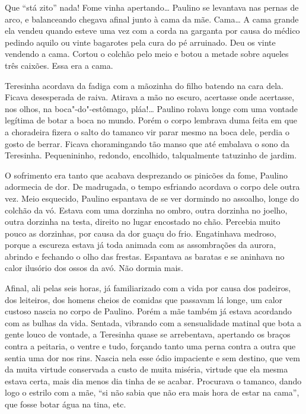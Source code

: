 \begin{linenumbers}
Que ``stá zito'' nada! Fome vinha apertando\ldots{} Paulino se levantava nas
pernas de arco, e balanceando chegava afinal junto à cama da mãe.
Cama\ldots{} A cama grande ela vendeu quando esteve uma vez com a corda na
garganta por causa do médico pedindo aquilo ou vinte bagarotes pela cura
do pé arruinado. Deu os vinte vendendo a cama. Cortou o colchão pelo
meio e botou a metade sobre aqueles três caixões. Essa era a cama.

Teresinha acordava da fadiga com a mãozinha do filho batendo na cara
dela. Ficava desesperada de raiva. Atirava a mão no escuro, acertasse
onde acertasse, nos olhos, na boca"-do"-estômago, pláa!\ldots{} Paulino rolava
longe com uma vontade legítima de botar a boca no mundo. Porém o corpo
lembrava duma feita em que a choradeira fizera o salto do tamanco vir
parar mesmo na boca dele, perdia o gosto de berrar. Ficava choramingando
tão manso que até embalava o sono da Teresinha. Pequenininho, redondo,
encolhido, talqualmente tatuzinho de jardim.

O sofrimento era tanto que acabava desprezando os pinicões da fome,
Paulino adormecia de dor. De madrugada, o tempo esfriando acordava o
corpo dele outra vez. Meio esquecido, Paulino espantava de se ver
dormindo no assoalho, longe do colchão da vó. Estava com uma dorzinha no
ombro, outra dorzinha no joelho, outra dorzinha na testa, direito no
lugar encostado no chão. Percebia muito pouco as dorzinhas, por causa da
dor guaçu do frio. Engatinhava medroso, porque a escureza estava já toda
animada com as assombrações da aurora, abrindo e fechando o olho das
frestas. Espantava as baratas e se aninhava no calor ilusório dos ossos
da avó. Não dormia mais.

Afinal, ali pelas seis horas, já familiarizado com a vida por causa dos
padeiros, dos leiteiros, dos homens cheios de comidas que passavam lá
longe, um calor custoso nascia no corpo de Paulino. Porém a mãe também
já estava acordando com as bulhas da vida. Sentada, vibrando com a
sensualidade matinal que bota a gente louco de vontade, a Teresinha
quase se arrebentava, apertando os braços contra a peitaria, o ventre e
tudo, forçando tanto uma perna contra a outra que sentia uma dor nos
rins. Nascia nela esse ódio impaciente e sem destino, que vem da muita
virtude conservada a custo de muita miséria, virtude que ela mesma
estava certa, mais dia menos dia tinha de se acabar. Procurava o
tamanco, dando logo o estrilo com a mãe, ``si não sabia que não era mais
hora de estar na cama'', que fosse botar água na tina, etc.


\end{linenumbers}
